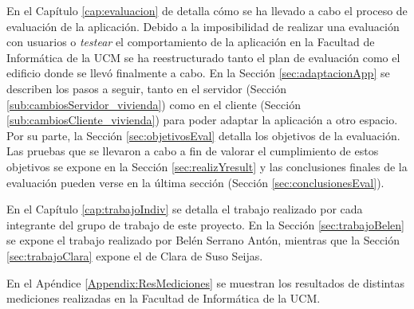 En el Capítulo \ref{cap:evaluacion} de detalla cómo se ha llevado a cabo el proceso de evaluación de la aplicación. Debido a la imposibilidad de realizar una evaluación con usuarios o \textit{testear} el comportamiento de la aplicación en la Facultad de Informática de la UCM se ha reestructurado tanto el plan de evaluación como el edificio donde se llevó finalmente a cabo. En la Sección \ref{sec:adaptacionApp} se describen los pasos a seguir, tanto en el servidor (Sección \ref{sub:cambiosServidor_vivienda}) como en el cliente (Sección \ref{sub:cambiosCliente_vivienda}) para poder adaptar la aplicación a otro espacio. Por su parte, la Sección \ref{sec:objetivosEval} detalla los objetivos de la evaluación. Las pruebas que se llevaron a cabo a fin de valorar el cumplimiento de estos objetivos se expone en la Sección \ref{sec:realizYresult} y las conclusiones finales de la evaluación pueden verse en la última sección (Sección \ref{sec:conclusionesEval}).

En el Capítulo \ref{cap:trabajoIndiv} se detalla el trabajo realizado por cada integrante del grupo de trabajo de este proyecto. En la Sección \ref{sec:trabajoBelen} se expone el trabajo realizado por Belén Serrano Antón, mientras que la Sección \ref{sec:trabajoClara} expone el de Clara de Suso Seijas.

En el Apéndice \ref{Appendix:ResMediciones} se muestran los resultados de distintas mediciones realizadas en la Facultad de Informática de la UCM.